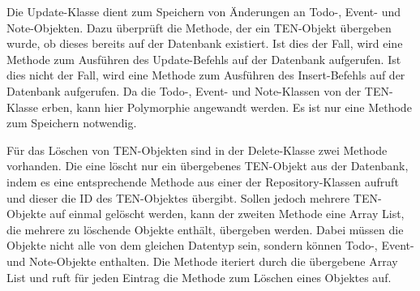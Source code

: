 Die Update-Klasse dient zum Speichern von Änderungen an Todo-, Event- und Note-Objekten. Dazu überprüft die Methode, der ein TEN-Objekt übergeben wurde, ob dieses bereits auf der Datenbank existiert. Ist dies der Fall, wird eine Methode zum Ausführen des Update-Befehls auf der Datenbank aufgerufen. Ist dies nicht der Fall, wird eine Methode zum Ausführen des Insert-Befehls auf der Datenbank aufgerufen. Da die Todo-, Event- und Note-Klassen von der TEN-Klasse erben, kann hier Polymorphie angewandt werden. Es ist nur eine Methode zum Speichern notwendig.

Für das Löschen von TEN-Objekten sind in der Delete-Klasse zwei Methode vorhanden. Die eine löscht nur ein übergebenes TEN-Objekt aus der Datenbank, indem es eine entsprechende Methode aus einer der Repository-Klassen aufruft und dieser die ID des TEN-Objektes übergibt. Sollen jedoch mehrere TEN-Objekte auf einmal gelöscht werden, kann der zweiten Methode eine Array List, die mehrere zu löschende Objekte enthält, übergeben werden. Dabei müssen die Objekte nicht alle von dem gleichen Datentyp sein, sondern können Todo-, Event- und Note-Objekte enthalten. Die Methode iteriert durch die übergebene Array List und ruft für jeden Eintrag die Methode zum Löschen eines Objektes auf.


